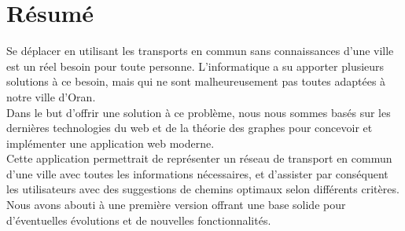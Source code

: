 \chapter*{Résumé} 

Se déplacer en utilisant les transports en commun sans connaissances d'une ville est un réel besoin pour toute personne. L'informatique a su apporter plusieurs solutions à ce besoin, mais qui ne sont malheureusement pas toutes adaptées à notre ville d'Oran.\\
Dans le but d'offrir une solution à ce problème, nous nous sommes basés sur les dernières technologies du web et de la théorie des graphes pour concevoir et implémenter une application web moderne.\\
Cette application permettrait de représenter un réseau de transport en commun d'une ville avec toutes les informations nécessaires, et d'assister par conséquent les utilisateurs avec des suggestions de chemins optimaux selon différents critères.\\
Nous avons abouti à une première version offrant une base solide pour d'éventuelles évolutions et de nouvelles fonctionnalités.

